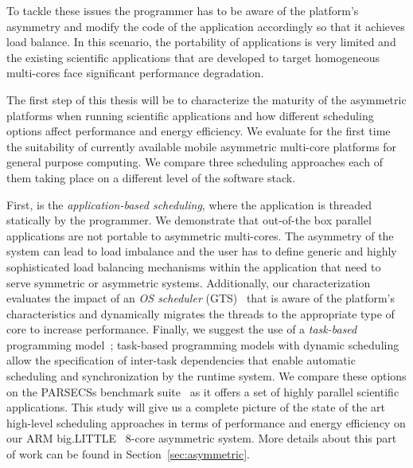 To tackle these issues the programmer has to be aware of the platform's asymmetry and modify the code of the application accordingly so that it achieves load balance. 
In this scenario, the portability of applications is very limited and the existing scientific applications that are developed to target homogeneous multi-cores face significant performance degradation. 

The first step of this thesis will be to characterize the maturity of the asymmetric platforms when running scientific applications and how different scheduling options affect performance and energy efficiency.
We evaluate for the first time the suitability of currently available mobile asymmetric multi-core platforms for general purpose computing. 
We compare three scheduling approaches each of them taking place on a different level of the software stack. 

First, is the \textit{application-based scheduling}, where the application is threaded statically by the programmer. 
We demonstrate that out-of-the box parallel applications are not portable to asymmetric multi-cores.
The asymmetry of the system can lead to load imbalance and the user has to define generic and highly sophisticated load balancing mechanisms within the application that need to serve symmetric or asymmetric systems. 
Additionally, our characterization evaluates the impact of an \textit{OS scheduler} (GTS)~\cite{samsung} that is aware of the platform's characteristics and dynamically migrates the threads to the appropriate type of core to increase performance.
Finally, we suggest the use of a \textit{task-based} programming model~\cite{OpenMP4.0:Manual2013, OmpSs_PPL11, Zuckerman:EXADAPT2011, Bauer.2012.SC, Vandierendonck:PACT2011};
task-based programming models with dynamic scheduling allow the specification of inter-task dependencies that enable automatic scheduling and synchronization by the runtime system.
We compare these options on the PARSECSs benchmark suite~\cite{Chasapis:TACO2016} as it offers a set of highly parallel scientific applications.
This study will give us a complete picture of the state of the art high-level scheduling approaches in terms of performance and energy efficiency on our ARM big.LITTLE~\cite{ARM} 8-core asymmetric system.
More details about this part of work can be found in Section~\ref{sec:asymmetric}.


